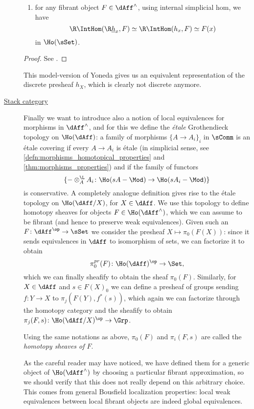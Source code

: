 \begin{description}
\begin{prop}
\begin{enumerate}
                    \item for any fibrant object $F \in \dAff^{\wedge}$, using internal simplicial hom, we have \[\R\IntHom(\R\underline{h}_x, F) \simeq \R\IntHom(h_x, F) \simeq F(x) \] in $\Ho(\sSet)$.
                \end{enumerate}
            \end{prop}
            \begin{proof}
                See \cite[Theorem~4.2.3]{ToVe:hag1}.
            \end{proof}
            This model-version of Yoneda gives us an equivalent representation of the discrete presheaf $h_X$, which is clearly not discrete anymore.
        
            
            \item[\underline{Stack category}] \label{description:stack_category} Finally we want to introduce also a notion of local equivalences for morphisms in $\dAff^{\wedge}$, and for this we define the \emph{étale} Grothendieck topology on $\Ho(\dAff)$: a family of morphisms $\{A \to A_i\}_i$ in $\sComm$ is an étale covering if every $A \to A_i$ is étale (in simplicial sense, see \cref{defn:morphisms_homotopical_properties} and \cref{thm:morphisms_properties}) and if the family of functors \[\{- \otimes_A^{\L} A_i\colon \Ho(sA-\Mod) \to \Ho(sA_i-\Mod) \} \] is conservative. A completely analogue definition gives rise to the étale topology on $\Ho(\dAff/X)$, for $X \in \dAff$.
            We use this topology to define homotopy sheaves for objects $F \in \Ho(\dAff^{\wedge})$, which we can assume to be fibrant (and hence to preserve weak equivalences). Given such an $F\colon \dAff^{\op} \to \sSet$ we consider the presheaf $X \mapsto \pi_0(F(X))$: since it sends equivalences in $\dAff$ to isomorphism of sets, we can factorize it to obtain \[\pi_0^{pr}(F)\colon \Ho(\dAff)^{\op} \to \Set,\] which we can finally sheafify to obtain the sheaf $\pi_0(F)$. Similarly, for $X \in \dAff$ and $s \in F(X)_0$ we can define a presheaf of groups sending $f\colon Y \to X$ to $\pi_j(F(Y), f^*(s))$, which again we can factorize through the homotopy category and the sheafify to obtain $\pi_j(F, s)\colon \Ho(\dAff/X)^{\op} \to \Grp$. 
            \begin{defn}
                \label{defn:derived_homotopy_sheaves}
                Using the same notations as above, $\pi_0(F)$ and $\pi_i(F, s)$ are called the \emph{homotopy sheaves of $F$}.
            \end{defn}
            As the careful reader may have noticed, we have defined them for a generic object of $\Ho(\dAff^{\wedge})$ by choosing a particular fibrant approximation, so we should verify that this does not really depend on this arbitrary choice. This comes from general Bousfield localization properties: local weak equivalences between local fibrant objects are indeed global equivalences.

\end{description}

